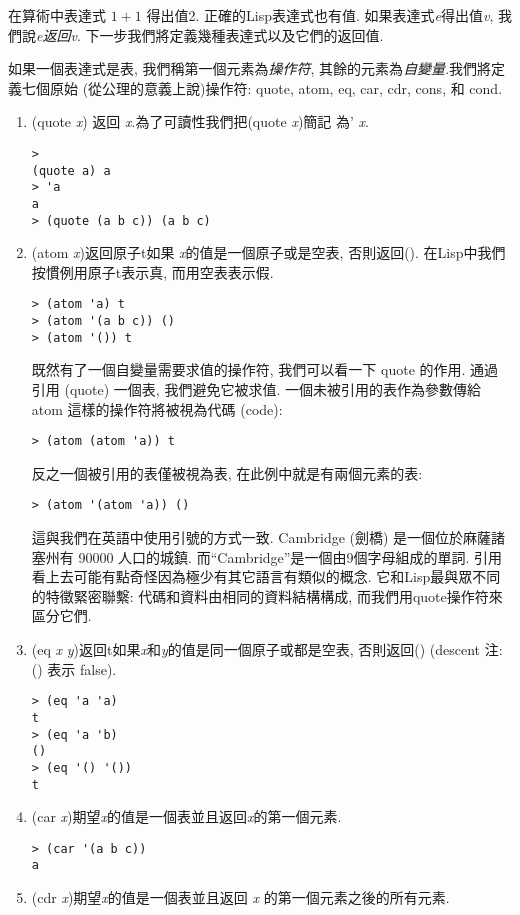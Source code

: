 \documentclass[12pt]{article}
\begin{document}
\begin{CJK}{UTF8}{bsmi}
在算術中表達式 $1 + 1$ 得出值2. 
正確的Lisp表達式也有值. 
如果表達式{\it e}得出值{\it v}, 我們說{\it e}{\em 返回}{\it v}. 
下一步我們將定義幾種表達式以及它們的返回值. 

如果一個表達式是表, 我們稱第一個元素為{\em 操作符}, 其餘的元素為{\em 自變量}.我們將定義七個原始
(從公理的意義上說)操作符: 
quote, atom, eq, car, cdr, cons, 和 cond. 

\begin{enumerate} 
\item 
(quote 
{\it 
x}) 
返回{\it 
x}.為了可讀性我們把(quote 
{\it 
x})簡記 
為'{\it 
x}. 

\begin{verbatim} 
> 
(quote a) a 
> 'a 
a 
> (quote (a b c)) (a b c) 
\end{verbatim} 
\item 
(atom 
{\it 
x})返回原子t如果{\it 
x}的值是一個原子或是空表, 否則返回(). 
在Lisp中我們 
按慣例用原子t表示真, 
而用空表表示假. 
\begin{verbatim} 
> (atom 'a) t 
> (atom '(a b c)) () 
> (atom '()) t 
\end{verbatim} 
既然有了一個自變量需要求值的操作符, 
我們可以看一下 quote 的作用. 
通過引用 (quote) 一個表, 我們避免它被求值. 
一個未被引用的表作為參數傳給 atom 這樣的操作符將被視為代碼 (code): 
\begin{verbatim} 
> (atom (atom 'a)) t 
\end{verbatim} 
反之一個被引用的表僅被視為表, 
在此例中就是有兩個元素的表: 
\begin{verbatim} 
> (atom '(atom 'a)) () 
\end{verbatim} 
這與我們在英語中使用引號的方式一致. 
{\rm Cambridge} (劍橋) 是一個位於麻薩諸塞州有 90000 人口的城鎮. 
而``{\rm Cambridge}''是一個由9個字母組成的單詞. 
引用看上去可能有點奇怪因為極少有其它語言有類似的概念. 
它和Lisp最與眾不同的特徵緊密聯繫: 代碼和資料由相同的資料結構構成, 
而我們用quote操作符來區分它們. 
\item 
(eq {\it x} {\it y})返回t如果{\it x}和{\it y}的值是同一個原子或都是空表, 否則返回() (descent 注: () 表示 false). 
\begin{verbatim} 
> (eq 'a 'a) 
t 
> (eq 'a 'b) 
() 
> (eq '() '()) 
t 
\end{verbatim} 
\item 
(car {\it x})期望{\it x}的值是一個表並且返回{\it x}的第一個元素. 
\begin{verbatim} 
> (car '(a b c)) 
a 
\end{verbatim} 
\item 
(cdr {\it x})期望{\it x}的值是一個表並且返回 {\it x} 的第一個元素之後的所有元素. 

\end{enumerate}
\end{CJK}
\end{document}
